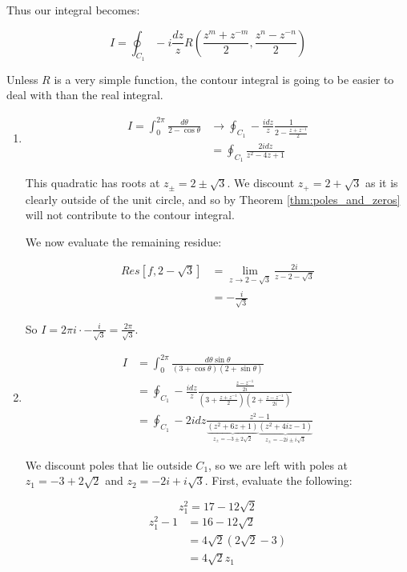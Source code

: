 \documentclass{../../physics_notes}
\begin{document}
Thus our integral becomes:

\[I = \oint_{C_1} -i \frac{dz}{z} R(\frac{z^m + z^{-m}}{2}, \frac{z^n - z^{-n}}{2})\]

Unless $R$ is a very simple function, the contour integral is going to be easier to deal with than the real integral. 

\begin{example}{}
\begin{enumerate}
\item{
	\begin{align*}
		I = \int_0^{2\pi} \frac{d\theta}{2-\cos{\theta}} &\rightarrow \oint_{C_1} -\frac{idz}{z} \frac{1}{2 - \frac{z + z^{-1}}{2}} \\
		&= \oint_{C_1} \frac{2idz}{z^2 - 4z + 1}
	\end{align*}

	This quadratic has roots at $z_\pm = 2\pm\sqrt{3}$. We discount $z_+ = 2+\sqrt{3}$ as it is clearly outside of the unit circle, and so by Theorem \ref{thm:poles_and_zeros} will not contribute to the contour integral. 

	We now evaluate the remaining residue:

	\begin{align*}
		Res[f, 2-\sqrt{3}] &= \lim_{z\to 2-\sqrt{3}} \frac{2i}{z-2-\sqrt{3}} \\
		&= -\frac{i}{\sqrt{3}}
	\end{align*}
	
	So $I = 2\pi i \cdot -\frac{i}{\sqrt{3}} = \frac{2\pi}{\sqrt{3}}$.	
}
\item{
	\begin{align*}
		I &= \int_0^{2\pi} \frac{d\theta \sin{\theta}}{(3+\cos{\theta})(2+\sin{\theta})} \\
		&= \oint_{C_1} -\frac{idz}{z} \frac{\frac{z - z^{-1}}{2i}}{(3 + \frac{z + z^{-1}}{2})(2 + \frac{z - z^{-1}}{2i})} \\
		&= \oint_{C_1} -2idz \frac{z^2 - 1}{\underbrace{(z^2 + 6z + 1)}_{z_\pm = -3\pm 2\sqrt{2}} \underbrace{(z^2 + 4iz - 1)}_{z_\pm = -2i \pm i\sqrt{3}}}
	\end{align*}

	We discount poles that lie outside $C_1$, so we are left with poles at $z_1 = -3 + 2\sqrt{2}$ and $z_2 = -2i + i\sqrt{3}$. First, evaluate the following:

	 \[
	 	z_1^2 = 17 - 12\sqrt{2}
 	\] 
 	\begin{align*}
 		z_1^2 - 1 &= 16 - 12\sqrt{2} \\
 		&= 4\sqrt{2}(2\sqrt{2} - 3) \\
 		&= 4\sqrt{2}z_1
 	\end{align*}

}
\end{enumerate}
\end{example}
\end{document}
